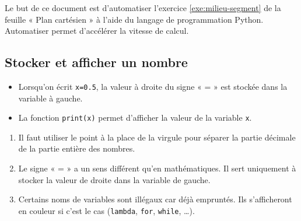 

\usepackage{minted}

\SetDate[17/10/2025]


\pagestyle{fancy}
\fancyhead[R]{\today}

Le but de ce document est d'automatiser l'exercice \ref{exe:milieu-segment} de la feuille « Plan cartésien » à l'aide du langage de programmation Python.
Automatiser permet d'accélérer la vitesse de calcul.

\setcounter{Exercise}{9}


\setlength\columnsep{30pt}

\subsection*{Stocker et afficher un nombre}

\begin{multicols}{2}
	\begin{itemize}
		\item
	Lorsqu'on écrit \texttt{x=0.5}, la valeur à droite du signe « = » est stockée dans la variable à gauche.
		\item
	La fonction \texttt{print(x)} permet d'afficher la valeur de la variable \texttt{x}.
	\end{itemize}
	
	\columnbreak
	\centering
	\begin{minipage}{.1\textwidth}
	\end{minipage}
\end{multicols}

\begin{enumerate}[label=\warning]
	\item
	Il faut utiliser le point à la place de la virgule pour séparer la partie décimale de la partie entière des nombres.

	\item
	 Le signe « = » a un sens différent qu'en mathématiques. Il sert uniquement à stocker la valeur de droite dans la variable de gauche.

	\item
	 Certains noms de variables sont illégaux car déjà empruntés. Ils s'afficheront en couleur si c'est le cas (\texttt{lambda}, \texttt{for}, \texttt{while}, \dots).
\end{enumerate}


